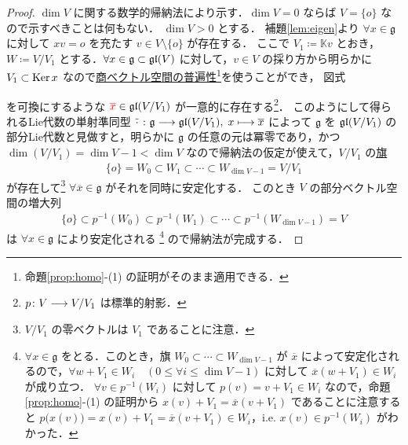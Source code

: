 \documentclass[rep_main]{subfiles}
\begin{document}
\begin{proof}
    $\dim V$ に関する数学的帰納法により示す．$\dim V = 0$ ならば $V = \{o\}$ なので示すべきことは何もない．
    $\dim V > 0$ とする．
    補題\ref{lem:eigen}より $\forall x \in \mathfrak{g}$ に対して $x v = o$ を充たす $v \in V \setminus \{o\}$ が存在する．
    ここで $V_1 \coloneqq \mathbb{K} v$ とおき，$W \coloneqq V / V_1$ とする．$\forall x \in \mathfrak{g} \subset \mathfrak{gl} (V)$ に対して，$v \in V$ の採り方から明らかに $V_1 \subset \operatorname{Ker} x$ なので\hyperref[prop:homo]{商ベクトル空間の普遍性}\footnote{命題\ref{prop:homo}-(1) の証明がそのまま適用できる．}を使うことができ，
    図式
    \begin{center}
    \end{center}
    を可換にするような $\textcolor{red}{\overline{x}} \in \mathfrak{gl}(V/V_1)$ が一意的に存在する\footnote{$p \colon V \longrightarrow V/V_1$ は標準的射影．}．
    このようにして得られるLie代数の単射準同型 $\overline{\cdot}\; \colon \mathfrak{g} \longrightarrow \mathfrak{gl}(V/V_1),\; x \longmapsto \overline{x}$ によって $\mathfrak{g}$ を $\mathfrak{gl} (V/V_1)$ の部分Lie代数と見做すと，明らかに $\mathfrak{g}$ の任意の元は冪零であり，かつ $\dim (V/V_1) = \dim V - 1 < \dim V$ なので帰納法の仮定が使えて，$V/V_1$ の\hyperref[def:flag]{旗}
    \begin{align}
        \{o\} = W_0 \subset W_1 \subset \cdots \subset W_{\dim V - 1} = V/V_1
    \end{align}
    が存在して\footnote{$V/V_1$ の零ベクトルは $V_1$ であることに注意．} $\forall \overline{x} \in \mathfrak{g}$ がそれを同時に安定化する．
    このとき $V$ の部分ベクトル空間の増大列
    \begin{align}
        \{o\} \subset p^{-1} (W_0) \subset p^{-1}(W_1) \subset \cdots \subset p^{-1}(W_{\dim V - 1}) = V
    \end{align}
    は $\forall x \in \mathfrak{g}$ により安定化される
    \footnote{
        $\forall x \in \mathfrak{g}$ をとる．このとき，旗 $W_0 \subset \cdots \subset W_{\dim V -1}$ が $\overline{x}$ によって安定化されるので，$\forall w + V_1 \in W_i\quad (0 \le \forall i \le \dim V - 1)$ に対して $\overline{x}(w + V_1) \in W_i$ が成り立つ．
        $\forall v \in p^{-1}(W_i)$ に対して $p(v) = v + V_1 \in W_i$ なので，命題\ref{prop:homo}-(1) の証明から $x(v) + V_1 = \overline{x}(v + V_1)$ であることに注意すると $p\bigl(x(v)\bigr) = x(v) + V_1 = \overline{x}(v + V_1) \in W_i$，i.e. $x(v) \in p^{-1}(W_i)$ がわかった．
    }
    ので帰納法が完成する．
\end{proof}
\end{document}
